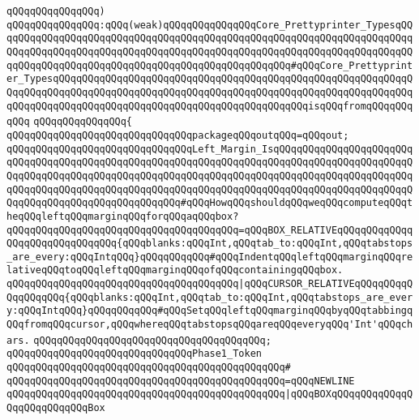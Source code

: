 \verb|qQQqqQQqqQQqqQQq)|\newline
\verb|qQQqqQQqqQQqqQQq:qQQq(weak)qQQqqQQqqQQqqQQqCore_Prettyprinter_TypesqQQqqQQqqQQqqQQqqQQqqQQqqQQqqQQqqQQqqQQqqQQqqQQqqQQqqQQqqQQqqQQqqQQqqQQqqQQqqQQqqQQqqQQqqQQqqQQqqQQqqQQqqQQqqQQqqQQqqQQqqQQqqQQqqQQqqQQqqQQqqQQqqQQqqQQqqQQqqQQqqQQqqQQqqQQqqQQqqQQqqQQqqQQqqQQq#qQQqCore_Prettyprinter_TypesqQQqqQQqqQQqqQQqqQQqqQQqqQQqqQQqqQQqqQQqqQQqqQQqqQQqqQQqqQQqqQQqqQQqqQQqqQQqqQQqqQQqqQQqqQQqqQQqqQQqqQQqqQQqqQQqqQQqqQQqqQQqqQQqqQQqqQQqqQQqqQQqqQQqqQQqqQQqqQQqqQQqqQQqqQQqqQQqqQQqqQQqisqQQqfromqQQqqQQqqQQq|\newline
\verb|qQQqqQQqqQQqqQQq{|\newline
\verb|qQQqqQQqqQQqqQQqqQQqqQQqqQQqqQQqpackageqQQqoutqQQq=qQQqout;|\newline
\newline
\verb|qQQqqQQqqQQqqQQqqQQqqQQqqQQqqQQqLeft_Margin_IsqQQqqQQqqQQqqQQqqQQqqQQqqQQqqQQqqQQqqQQqqQQqqQQqqQQqqQQqqQQqqQQqqQQqqQQqqQQqqQQqqQQqqQQqqQQqqQQqqQQqqQQqqQQqqQQqqQQqqQQqqQQqqQQqqQQqqQQqqQQqqQQqqQQqqQQqqQQqqQQqqQQqqQQqqQQqqQQqqQQqqQQqqQQqqQQqqQQqqQQqqQQqqQQqqQQqqQQqqQQqqQQqqQQqqQQqqQQqqQQqqQQqqQQqqQQqqQQqqQQqqQQq#qQQqHowqQQqshouldqQQqweqQQqcomputeqQQqtheqQQqleftqQQqmarginqQQqforqQQqaqQQqbox?|\newline
\verb|qQQqqQQqqQQqqQQqqQQqqQQqqQQqqQQqqQQqqQQq=qQQqBOX_RELATIVEqQQqqQQqqQQqqQQqqQQqqQQqqQQqqQQq{qQQqblanks:qQQqInt,qQQqtab_to:qQQqInt,qQQqtabstops_are_every:qQQqIntqQQq}qQQqqQQqqQQq#qQQqIndentqQQqleftqQQqmarginqQQqrelativeqQQqtoqQQqleftqQQqmarginqQQqofqQQqcontainingqQQqbox.|\newline
\verb|qQQqqQQqqQQqqQQqqQQqqQQqqQQqqQQqqQQqqQQq|\verb#|qQQqCURSOR_RELATIVEqQQqqQQqqQQqqQQqqQQq{qQQqblanks:qQQqInt,qQQqtab_to:qQQqInt,qQQqtabstops_are_every:qQQqIntqQQq}qQQqqQQqqQQq#\verb|#qQQqSetqQQqleftqQQqmarginqQQqbyqQQqtabbingqQQqfromqQQqcursor,qQQqwhereqQQqtabstopsqQQqareqQQqeveryqQQq'Int'qQQqchars.|\newline
\verb|qQQqqQQqqQQqqQQqqQQqqQQqqQQqqQQqqQQqqQQq;|\newline
\newline
\verb|qQQqqQQqqQQqqQQqqQQqqQQqqQQqqQQqPhase1_Token|\newline
\verb|qQQqqQQqqQQqqQQqqQQqqQQqqQQqqQQqqQQqqQQqqQQqqQQq#|\newline
\verb|qQQqqQQqqQQqqQQqqQQqqQQqqQQqqQQqqQQqqQQqqQQqqQQq=qQQqNEWLINE|\newline
\verb|qQQqqQQqqQQqqQQqqQQqqQQqqQQqqQQqqQQqqQQqqQQqqQQq|\verb#|qQQqBOXqQQqqQQqqQQqqQQqqQQqqQQqqQQqBox#\newline
